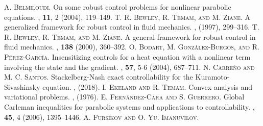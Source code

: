 \documentclass[preprint,10pt]{article}
\numberwithin{equation}{section}
\numberwithin{theorem}{section}
\begin{document}
{\begin{thebibliography}{7}
%
\textsc{A. Belmiloudi.}
\newblock On some robust control problems for nonlinear parabolic equations.
, \textbf{11}, 2 (2004), 119--149.
%
\textsc{T. R. Bewley, R. Temam, and M. Ziane.}
\newblock A generalized framework for robust control in fluid mechanics. 
, (1997), 299--316.
%
\textsc{T. R. Bewley, R. Temam, and M. Ziane.}
\newblock A general framework for robust control in fluid mechanics.
, \textbf{138} (2000), 360--392.
%
\textsc{O. Bodart, M. Gonz\'alez-Burgos, and R. P\'erez-Garc\'ia.}
\newblock Insensitizing controls for a heat equation with a nonlinear term involving the state and the gradient. 
, \textbf{57}, 5-6 (2004), 687--711.
%
\textsc{N. Carre\~{n}o and M. C. Santos}.
\newblock Stackelberg-Nash exact controllability for the Kuramoto-Sivashinsky equation.
, (2018). 
%
\textsc{I. Ekeland and R. Temam.}
\newblock Convex analysis and variational problems.
, (1976).
%
%
%
\textsc{E. Fern\'andez-Cara and S. Guerrero.}
\newblock Global {C}arleman inequalities for parabolic systems and applications to controllability.
, \textbf{45}, 4 (2006), 1395--1446.
%
%
\textsc{A. Fursikov and O. Yu. Imanuvilov.}

\end{thebibliography}}
\end{document}
